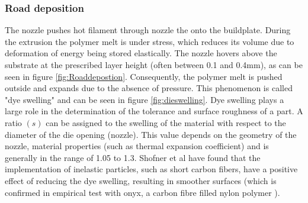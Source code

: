 \subsubsection{Road deposition}
    \label{Road deposition}
The nozzle pushes hot filament through nozzle the onto the buildplate. During the extrusion the polymer melt is under stress, which reduces its volume due to deformation of energy being stored elastically. The nozzle hovers above the substrate at the prescribed layer height (often between 0.1 and 0.4mm), as can be seen in figure \ref{fig:Roaddepostion}. Consequently, the polymer melt is pushed outside and expands due to the absence of pressure. This phenomenon is called "dye swelling" and can be seen in figure \ref{fig:dieswelling}. Dye swelling plays a large role in the determination of the tolerance and surface roughness of a part. A ratio $(s)$ can be assigned to the swelling of the material with respect to the diameter of the die opening (nozzle). This value depends on the geometry of the nozzle, material properties (such as thermal expansion coefficient) and is generally in the range of 1.05 to 1.3. Shofner et al\cite{Turner2014AModeling} have found that the implementation of inelastic particles, such as short carbon fibers, have a positive effect of reducing the dye swelling, resulting in smoother surfaces (which is confirmed in empirical test with onyx, a carbon fibre filled nylon polymer \cite{TNO2017ProcesbegeleidingLearned}). 


